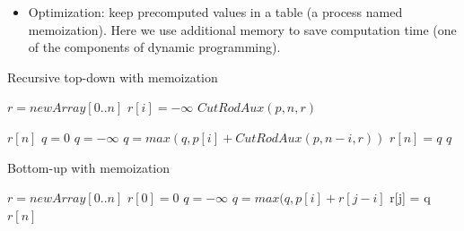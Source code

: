 \begin{frame}

  \begin{itemize}
  \item Optimization: keep precomputed values in a table (a process named {\color{blue}memoization}). \pause Here we use additional memory to save
    computation time (one of
  the components of dynamic programming).

  \end{itemize}
\end{frame}


\begin{frame}
  \begin{block}{Recursive top-down with memoization}
\begin{small}
    \begin{algorithmic}
        \State $r = new Array[0..n]$
           \State $r[i] = - \infty$
        \EndFor
        \State $CutRodAux(p, n, r)$   
        \EndProcedure
    \end{algorithmic}
    \pause 
    \begin{algorithmic}
         $r[n]$
      \EndIf
        \State $q = 0$ 
      \Else
        \State $q = - \infty$
          \State $q = max(q, p[i] + CutRodAux(p, n-i, r))$ 
        \EndFor
      \EndIf
      \State $r[n] = q$   
       $q$   
    \EndProcedure
  \end{algorithmic}  
 \end{small}
  \end{block}
\end{frame}


\begin{frame}
  \begin{block}{Bottom-up with memoization}
\begin{small}
    \begin{algorithmic}
      \State $r = new Array[0..n]$
      \State $r[0] = 0$
       \State $q = - \infty$
          \State $q = max(q, p[i] + r[j-i]$
          \EndFor
          r[j] = q
       \EndFor
       $r[n]$   
    \EndProcedure
  \end{algorithmic}  
 \end{small}
  \end{block}
\end{frame}

